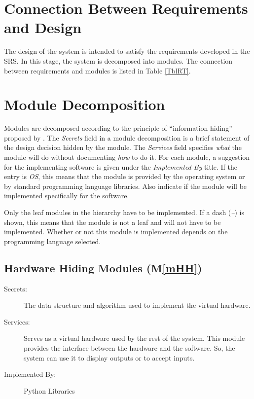 \documentclass[12pt, titlepage]{article}
\newcommand{\mref}[1]{M\ref{#1}}
\begin{document}
\section{Connection Between Requirements and Design} \label{SecConnection}

The design of the system is intended to satisfy the requirements developed in
the SRS. In this stage, the system is decomposed into modules. The connection
between requirements and modules is listed in Table \ref{TblRT}.

\section{Module Decomposition} \label{SecMD}

Modules are decomposed according to the principle of ``information hiding''
proposed by \citet{ParnasEtAl1984}. The \emph{Secrets} field in a module
decomposition is a brief statement of the design decision hidden by the
module. The \emph{Services} field specifies \emph{what} the module will do
without documenting \emph{how} to do it. For each module, a suggestion for the
implementing software is given under the \emph{Implemented By} title. If the
entry is \emph{OS}, this means that the module is provided by the operating
system or by standard programming language libraries.  Also indicate if the
module will be implemented specifically for the software.

Only the leaf modules in the
hierarchy have to be implemented. If a dash (\emph{--}) is shown, this means
that the module is not a leaf and will not have to be implemented. Whether or
not this module is implemented depends on the programming language
selected.

\subsection{Hardware Hiding Modules (\mref{mHH})}

\begin{description}
\item[Secrets:]The data structure and algorithm used to implement the virtual
  hardware.
\item[Services:]Serves as a virtual hardware used by the rest of the
  system. This module provides the interface between the hardware and the
  software. So, the system can use it to display outputs or to accept inputs.
\item[Implemented By:] Python Libraries
\end{description}
\end{document}
